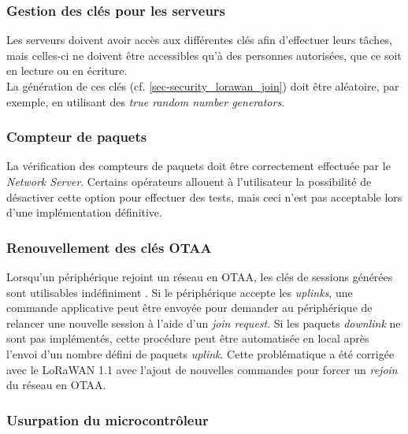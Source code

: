 \subsubsection{Gestion des clés pour les serveurs}


Les serveurs doivent avoir accès aux différentes clés afin d'effectuer leurs tâches, mais celles-ci ne doivent être accessibles qu'à des personnes autorisées, que ce soit en lecture ou en écriture. \\

La génération de ces clés (cf. \cref{sec-security_lorawan_join}) doit être aléatoire, par exemple, en utilisant des \textit{true random number generators}.


\subsubsection{Compteur de paquets}

La vérification des compteurs de paquets doit être correctement effectuée par le \textit{Network Server}. Certains opérateurs allouent à l'utilisateur la possibilité de désactiver cette option pour effectuer des tests, mais ceci n'est pas acceptable lors d'une implémentation définitive. 


\subsubsection{Renouvellement des clés OTAA}


Lorsqu'un périphérique rejoint un réseau en OTAA, les clés de sessions générées sont utilisables indéfiniment \cite{ttnvideos_security:online}. Si le périphérique accepte les \textit{uplinks}, une commande applicative peut être envoyée pour demander au périphérique de relancer une nouvelle session à l'aide d'un \textit{join request}. Si les paquets \textit{downlink} ne sont pas implémentés, cette procédure peut être automatisée en local après l'envoi d'un nombre défini de paquets \textit{uplink}. Cette problématique a été corrigée avec le LoRaWAN 1.1 avec l'ajout de nouvelles commandes pour forcer un \textit{rejoin} du réseau en OTAA.


\subsubsection{Usurpation du microcontrôleur}




